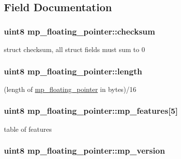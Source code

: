 \subsection{Field Documentation}
\hypertarget{structmp__floating__pointer_a53870a8883745e14a0dc97693f6423d7}{
\subsubsection[{checksum}]{\setlength{\rightskip}{0pt plus 5cm}uint8 {\bf mp\_\-floating\_\-pointer::checksum}}}
\label{structmp__floating__pointer_a53870a8883745e14a0dc97693f6423d7}
struct checksum, all struct fields must sum to 0 \hypertarget{structmp__floating__pointer_ade2aae9bc2dd565811eeed02d88f00e0}{
\subsubsection[{length}]{\setlength{\rightskip}{0pt plus 5cm}uint8 {\bf mp\_\-floating\_\-pointer::length}}}
\label{structmp__floating__pointer_ade2aae9bc2dd565811eeed02d88f00e0}
(length of \hyperlink{structmp__floating__pointer}{mp\_\-floating\_\-pointer} in bytes)/16 \hypertarget{structmp__floating__pointer_a6d79ccff9fab2288d0ac0a9702a8e8bd}{
\subsubsection[{mp\_\-features}]{\setlength{\rightskip}{0pt plus 5cm}uint8 {\bf mp\_\-floating\_\-pointer::mp\_\-features}\mbox{[}5\mbox{]}}}
\label{structmp__floating__pointer_a6d79ccff9fab2288d0ac0a9702a8e8bd}
table of features \hypertarget{structmp__floating__pointer_a82fa98b3895b4442d2fb20710b652613}{
\subsubsection[{mp\_\-version}]{\setlength{\rightskip}{0pt plus 5cm}uint8 {\bf mp\_\-floating\_\-pointer::mp\_\-version}}}
